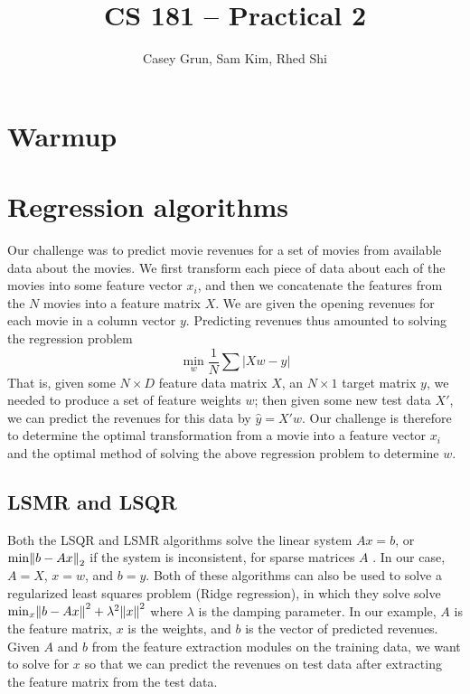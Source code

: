 \documentclass[11pt]{amsart}
\title{CS 181 -- Practical 2}
\author{Casey Grun, Sam Kim, Rhed Shi}
\begin{document}
\maketitle

\section{Warmup}

\section{Regression algorithms}

Our challenge was to predict movie revenues for a set of movies from available data about the movies. We first transform each piece of data about each of the movies into some feature vector $x_i$, and then we concatenate the features from the $N$ movies into a feature matrix $X$. We are given the opening revenues for each movie in a column vector $y$. Predicting revenues thus amounted to solving the regression problem
$$\min_w \frac{1}{N}\sum |X w - y|$$
That is, given some $N \times D$ feature data matrix $X$, an $N \times 1$ target matrix $y$, we needed to produce a set of feature weights $w$; then given some new test data $X'$, we can predict the revenues for this data by $\hat{y} = X' w$. Our challenge is therefore to determine the optimal transformation from a movie into a feature vector $x_i$ and the optimal method of solving the above regression problem to determine $w$. 

\subsection{LSMR and LSQR}

Both the LSQR and LSMR algorithms solve the linear system $Ax=b$, or $\text{min}\norm{b-Ax}_2$ if the system is inconsistent, for sparse matrices $A$ \cite{LSMR}. In our case, $A = X$, $x = w$, and $b = y$. Both of these algorithms can also be used to solve a regularized least squares problem (Ridge regression), in which they solve solve $\min_x\norm{b-Ax}^2+\lambda^2\norm{x}^2$ where $\lambda$ is the damping parameter. In our example, $A$ is the feature matrix, $x$ is the weights, and $b$ is the vector of predicted revenues. Given $A$ and $b$ from the feature extraction modules on the training data, we want to solve for $x$ so that we can predict the revenues on test data after extracting the feature matrix from the test data.
\end{document}
